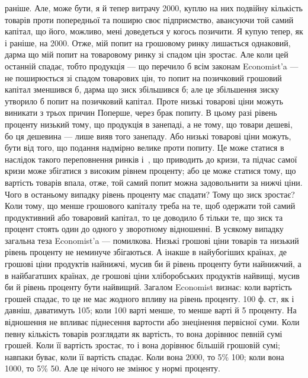 \parcont{}  %
раніше. Але, може бути, я й тепер витрачу 2000, куплю на них подвійну
кількість товарів проти попередньої та поширю своє підприємство, авансуючи
той самий капітал, що його, можливо, мені доведеться у когось позичити. Я купую
тепер, як і раніше, на 2000. Отже, мій попит на грошовому ринку лишається
однаковий, дарма що мій попит на товаровому ринку зі спадом цін зростає.
Але коли цей останній спадає, тобто продукція — що перечило б всім законам
Economist'a — не поширюється зі спадом товарових цін, то попит на
позичковий грошовий капітал зменшився б, дарма що зиск збільшився б; але
це збільшення зиску утворило б попит на позичковий капітал. Проте низькі
товарові ціни можуть виникати з трьох причин Поперше, через брак попиту.
В цьому разі рівень проценту низький тому, що продукція в занепаді, а не
тому, що товари дешеві, бо ця дешевина — лише вияв того занепаду. Або
низькі товарові ціни можуть, бути від того, що подання надмірно велике проти
попиту. Це може статися в наслідок такого переповнення ринків і~,
що приводить до кризи, та підчас самої кризи може збігатися з високим рівнем
проценту; або це може статися тому, що вартість товарів впала, отже, той
самий попит можна задовольнити за нижчі ціни. Чого в останьому випадку рівень
проценту має спадати? Тому що зиск зростає? Коли тому, що менше грошового
капіталу треба на те, щоб одержати той самий продуктивний або товаровий
капітал, то це доводило б тільки те, що зиск та процент стоять один до одного
у зворотному відношенні. В усякому випадку загальна теза Economist’a — помилкова.
Низькі грошові ціни товарів та низький рівень проценту не неминуче збігаються.
А інакше в найубогіших країнах, де грошові ціни продуктів найнижчі,
мусив би й рівень проценту бути найнижчий, а в найбагатших країнах, де
грошові ціни хліборобських продуктів найвищі, мусив би й рівень проценту
бути найвищий. Загалом Economist визнає: коли вартість грошей спадає, то це
не має жодного впливу на рівень проценту. 100 ф. ст, як і давніш, даватимуть
105; коли 100 варті менше, то менше варті й 5 проценту.
На відношення не впливає піднесення вартости або знецінення первісної суми.
Коли певну кількість товарів розглядати як вартість, то вона дорівнює певній
сумі грошей. Коли її вартість зростає, то і вона дорівнює більшій грошовій
сумі; навпаки буває, коли її вартість спадає. Коли вона \deq{} 2000, то 5\% \deq{}
100; коли вона \deq{} 1000, то 5\% \deq{} 50. Але це нічого не змінює у нормі проценту.
